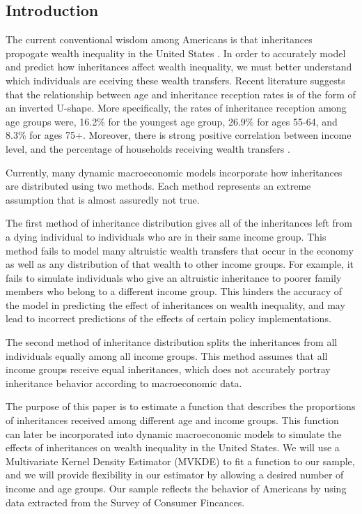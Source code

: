 \documentclass[letterpaper,12pt]{article}
\theoremstyle{definition}
\begin{document}
\begin{spacing}{1.5}

\section{Introduction}\label{SecIntro}

The current conventional wisdom among Americans is that inheritances propogate wealth inequality in the United States \citet{Wolff:2015}. In order to accurately model and predict how inheritances affect wealth inequality, we must better understand which individuals are eceiving these wealth transfers. Recent literature suggests that the relationship between age and inheritance reception rates is of the form of an inverted U-shape. More specifically, the rates of inheritance reception among age groups were, 16.2\% for the youngest age group, 26.9\% for ages 55-64, and 8.3\% for ages 75+. Moreover, there is strong positive correlation between income level, and the percentage of households receiving wealth transfers \citet{Wolff:2015}.

Currently, many dynamic macroeconomic models incorporate how
inheritances are distributed using two methods. Each method represents an extreme assumption 
that is almost assuredly not true.

The first method of inheritance distribution gives all of the inheritances left from a dying 
individual to individuals who are in their same income group. This method fails to model many 
altruistic wealth transfers that occur in the economy as well as any distribution of that wealth to 
other income groups. For example, it fails to simulate individuals who give an altruistic inheritance 
to poorer family members who belong to a different income group. This hinders the accuracy of 
the model in predicting the effect of inheritances on wealth inequality, and may lead to incorrect 
predictions of the effects of certain policy implementations.

The second method of inheritance distribution splits the inheritances from all individuals 
equally among all income groups. This method assumes that all income groups receive equal 
inheritances, which does not accurately portray inheritance behavior according to macroeconomic data.

  The purpose of this paper is to estimate a function that describes the proportions of inheritances received among different age and income groups. This function can later be incorporated into dynamic macroeconomic models to simulate the effects of inheritances on wealth inequality in the United States. We will use a Multivariate Kernel Density Estimator (MVKDE) to fit a function to our sample, and we will provide flexibility in our estimator by allowing a desired number of income and age groups. Our sample reflects the behavior of Americans by using data extracted from the Survey of Consumer Fincances.



\end{spacing}
\end{document}
